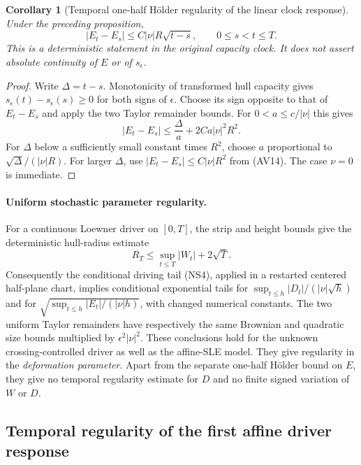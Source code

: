 \documentclass[11pt]{article}
\newtheorem{corollary}[theorem]{Corollary}
\theoremstyle{definition}\newtheorem{definition}[theorem]{Definition}
\theoremstyle{remark}\newtheorem{remark}[theorem]{Remark}
\begin{document}
\begin{corollary}[Temporal one-half H\"older regularity of the linear clock response]
\label{cor:affine-clock-holder}
Under the preceding proposition,
\[
 |E_t-E_s|\le C|\nu|R\sqrt{t-s},\qquad 0\le s<t\le T.
 \tag{AV17}
\]
This is a deterministic statement in the original capacity clock.
It does not assert absolute continuity of $E$ or of $s_\epsilon$.
\end{corollary}
\begin{proof}
Write $\Delta=t-s$. Monotonicity of transformed hull capacity gives
$s_\epsilon(t)-s_\epsilon(s)\ge0$ for both signs of $\epsilon$.
Choose its sign opposite to that of $E_t-E_s$ and apply the two
Taylor remainder bounds. For $0<a\le c/|\nu|$ this gives
\[
 |E_t-E_s|\le\frac{\Delta}{a}
                     +2Ca|\nu|^2R^2.
\]
For $\Delta$ below a sufficiently small constant times $R^2$,
choose $a$ proportional to $\sqrt\Delta/(|\nu|R)$.
For larger $\Delta$, use $|E_t-E_s|\le C|\nu|R^2$ from (AV14).
The case $\nu=0$ is immediate.
\end{proof}

\paragraph{Uniform stochastic parameter regularity.}
For a continuous Loewner driver on $[0,T]$, the strip and height
bounds give the deterministic hull-radius estimate
\[
 R_T\le\sup_{t\le T}|W_t|+2\sqrt T.
 \tag{AV16}
\]
Consequently the conditional driving tail (NS4), applied in a
restarted centered half-plane chart, implies conditional exponential
tails for $\sup_{t\le h}|D_t|/(|\nu|\sqrt h)$ and for
$\sqrt{\sup_{t\le h}|E_t|/(|\nu|h)}$, with changed numerical
constants. The two uniform Taylor remainders have respectively
the same Brownian and quadratic size bounds multiplied by
$\epsilon^2|\nu|^2$. These conclusions hold for the unknown
crossing-controlled driver as well as the affine-SLE model. They
give regularity in the \emph{deformation parameter}. Apart from the
separate one-half H\"older bound on $E$, they give no temporal
regularity estimate for $D$ and no finite signed variation of $W$ or $D$.

\subsection{Temporal regularity of the first affine driver response}
\label{sec:temporal-affine-response}
\end{document}
